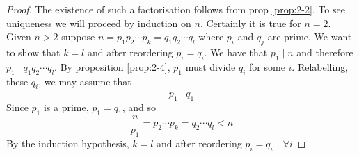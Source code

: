 \documentclass{article}
\begin{document}
\begin{proof}
    The existence of such a factorisation follows from prop \ref{prop:2-2}. To see uniqueness we will proceed by induction on $n$.
    Certainly it is true for $n=2$. Given $n > 2$ suppose $n = p_1p_2\cdots p_k = q_1q_2\cdots q_l$ where $p_i$ and $q_j$ are prime. We want to show that $k = l$ and after reordering $p_i = q_i$.
    We have that $p_1 \mid n$ and therefore $p_1 \mid q_1q_2\cdots q_l$. By proposition \ref{prop:2-4}, $p_1$ must divide $q_i$ for some $i$. Relabelling, these $q_i$, we may assume that
    \[
        p_1 \mid q_1 
    \]
    Since $p_1$ is a prime, $p_1 = q_1$, and so 
    \[
        \frac{n}{p_1} = p_2\cdots p_k = q_2\cdots q_l < n  
    \]
    By the induction hypothesis, $k = l$ and after reordering $p_i = q_i \quad \forall i$
\end{proof}

    
\end{document}
